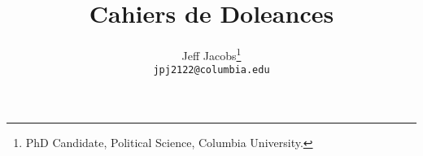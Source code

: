 \documentclass[12pt]{report}   %
\begin{document}
\title{Cahiers de Doleances}
\author{Jeff Jacobs\thanks{PhD Candidate, Political Science, Columbia University.}\\\texttt{jpj2122@columbia.edu}}

\maketitle

\setcounter{chapter}{0}


\end{document}
